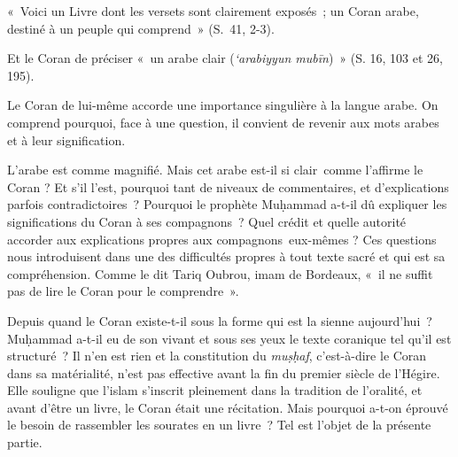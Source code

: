 
«~Voici un Livre dont les versets sont clairement exposés~; un Coran
arabe, destiné à un peuple qui comprend~» (S.~41, 2-3).

Et le Coran de préciser «~un arabe clair (\emph{`arabiyyun mubīn})~» (S.
16, 103 et 26, 195).

Le Coran de lui-même accorde une importance singulière à la langue
arabe. On comprend pourquoi, face à une question, il convient de revenir
aux mots arabes et à leur signification.

L'arabe est comme magnifié. Mais cet arabe est-il si clair~comme
l'affirme le Coran ? Et s'il l'est, pourquoi tant de niveaux de
commentaires, et d'explications parfois contradictoires~? Pourquoi le
prophète Muḥammad a-t-il dû expliquer les significations du Coran à ses
compagnons~? Quel crédit et quelle autorité accorder aux explications
propres aux compagnons~eux-mêmes ? Ces questions nous introduisent dans
une des difficultés propres à tout texte sacré et qui est sa
compréhension. Comme le dit Tariq Oubrou, imam de Bordeaux, «~il ne
suffit pas de lire le Coran pour le comprendre~».


Depuis quand le Coran existe-t-il sous la forme qui est la sienne
aujourd'hui~? Muḥammad a-t-il eu de son vivant et sous ses yeux le texte
coranique tel qu'il est structuré~? Il n'en est rien et la constitution
du \emph{muṣḥaf}, c'est-à-dire le Coran dans sa matérialité, n'est pas
effective avant la fin du premier siècle de l'Hégire. Elle souligne que
l'islam s'inscrit pleinement dans la tradition de l'oralité, et avant
d'être un livre, le Coran était une récitation. Mais pourquoi a-t-on
éprouvé le besoin de rassembler les sourates en un livre~? Tel est
l'objet de la présente partie.


